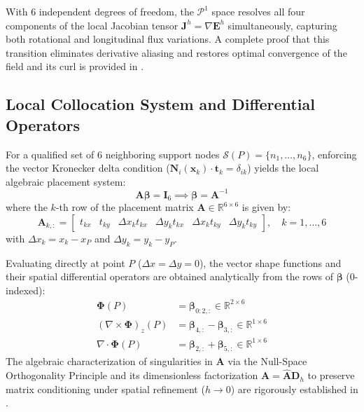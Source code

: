 \documentclass[11pt,a4paper]{article}
\begin{document}
With 6 independent degrees of freedom, the $\mathcal{P}^1$ space resolves all four components of the local Jacobian tensor $\mathbf{J}^h = \nabla \mathbf{E}^h$ simultaneously, capturing both rotational and longitudinal flux variations. A complete proof that this transition eliminates derivative aliasing and restores optimal convergence of the field and its curl is provided in \cite{mesquita_eabe}.

\subsection{Local Collocation System and Differential Operators}
For a qualified set of 6 neighboring support nodes $\mathcal{S}(P) = \{n_1, \dots, n_6\}$, enforcing the vector Kronecker delta condition ($\mathbf{N}_i(\mathbf{x}_k) \cdot \mathbf{t}_k = \delta_{ik}$) yields the local algebraic placement system:
\begin{equation}
\mathbf{A}\boldsymbol{\beta} = \mathbf{I}_6 \implies \boldsymbol{\beta} = \mathbf{A}^{-1}
\end{equation}
where the $k$-th row of the placement matrix $\mathbf{A} \in \mathbb{R}^{6 \times 6}$ is given by:
\begin{equation}
\mathbf{A}_{k,:} = \begin{bmatrix} t_{kx} & t_{ky} & \Delta x_k t_{kx} & \Delta y_k t_{kx} & \Delta x_k t_{ky} & \Delta y_k t_{ky} \end{bmatrix}, \quad k = 1, \dots, 6
\end{equation}
with $\Delta x_k = x_k - x_P$ and $\Delta y_k = y_k - y_P$.

Evaluating directly at point $P$ ($\Delta x = \Delta y = 0$), the vector shape functions and their spatial differential operators are obtained analytically from the rows of $\boldsymbol{\beta}$ (0-indexed):
\begin{align}
\boldsymbol{\Phi}(P) &= \boldsymbol{\beta}_{0:2, :} \in \mathbb{R}^{2 \times 6} \\
(\nabla \times \boldsymbol{\Phi})_z(P) &= \boldsymbol{\beta}_{4, :} - \boldsymbol{\beta}_{3, :} \in \mathbb{R}^{1 \times 6} \\
\nabla \cdot \boldsymbol{\Phi}(P) &= \boldsymbol{\beta}_{2, :} + \boldsymbol{\beta}_{5, :} \in \mathbb{R}^{1 \times 6}
\end{align}
The algebraic characterization of singularities in $\mathbf{A}$ via the Null-Space Orthogonality Principle and its dimensionless factorization $\mathbf{A} = \widehat{\mathbf{A}}\mathbf{D}_h$ to preserve matrix conditioning under spatial refinement ($h \to 0$) are rigorously established in \cite{mesquita_eabe}.
\end{document}
